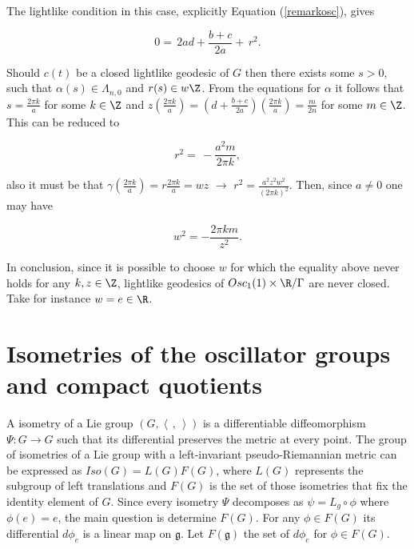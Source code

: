 \documentclass[11pt]{amsart}
\newcommand{\lela}{\left \langle}
\newcommand{\rira}{\right \rangle}
\theoremstyle{plain}
\theoremstyle{definition}
\theoremstyle{remark}
\begin{document}
	The lightlike condition in this case, explicitly Equation (\ref{remarkosc}), gives
	
	\begin{equation*}
		0 = \, 2 a d + \frac{b+c}{2a} + \, r^2. 
	\end{equation*}
	
	Should $c(t)$ be a closed lightlike geodesic of $G$ then there exists some  $s>0$, such that $\alpha(s) \in \Lambda_{n,0}$ and $r(s) \in w \Z$. From the equations for  $\alpha$ it follows that $s=\frac{2 \pi k}{a}$ for some $k \in \Z$ and $z(\frac{2 \pi k}{a})=(d+\frac{b+c}{2 a})(\frac{2 \pi k}{a})=\frac{m}{2n}$ for some $m \in \Z$. This can be reduced to 
	
	\begin{equation*}
		r^2 = \, - \frac{a^2 m}{2 \pi k},
	\end{equation*}
	
	also it must be that $\gamma(\frac{2 \pi k}{a}) = r \frac{2 \pi k}{a} = w z$ $\rightarrow$ $r^2 = \frac{a^2 z^2 w^2}{(2 \pi k)^2}$. Then,  since $a \neq 0$ one may have
	
	\begin{equation*}
		w^2 = -\frac{2 \pi k m}{z^2}.
	\end{equation*}
	
	In conclusion, since it is possible to choose $w$ for which the equality above never holds  for any $k,z \in \Z$, lightlike geodesics of $Osc_1(1) \times \R/\Gamma$ are never closed. Take for instance  $w = e\in \R$. 
	
	
	
	
	\section{Isometries of the oscillator groups and compact quotients}
A isometry of  a Lie group $(G, \lela\,,\,\rira)$ is a differentiable diffeomorphism $\Psi:G \to G$ such that its differential preserves the metric at every point.  
    The group of isometries of a Lie group with a left-invariant pseudo-Riemannian  metric can be expressed as $Iso(G) = L(G)F(G)$, where $L(G)$ represents the subgroup of left translations and $F(G)$ is the set of  those isometries that fix the identity element of $G$.  Since every isometry $\Psi$ decomposes as $\psi = L_g \circ \phi$ where $\phi(e)=e$, the main question is determine $F(G)$. For any $\phi\in F(G)$ its differential $d\phi_e$ is a linear map on $\mathfrak g$. Let $F(\mathfrak g)$ the set of $d\phi_e$ for  $\phi \in F(G)$.
    
\end{document}
